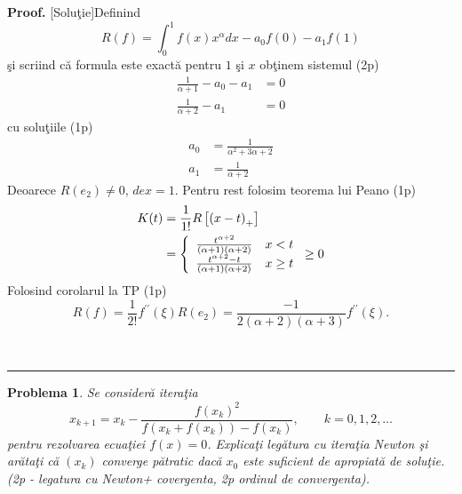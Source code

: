 \documentclass{article}%
\newtheorem{problem}[theorem]{Problema}
\newenvironment{proof}[1][Proof]{\noindent\textbf{#1.} }{\ \rule{0.5em}{0.5em}}
\begin{document}
\begin{proof}
[Solu\c{t}ie]Definind%
\[
R(f)=\int_{0}^{1}f(x)x^{\alpha}dx-a_{0}f(0)-a_{1}f(1)
\]
\c{s}i scriind c\u{a} formula este exact\u{a} pentru $1$ \c{s}i $x$
ob\c{t}inem sistemul (2p)%
\begin{align*}
\frac{1}{\alpha+1}-a_{0}-a_{1} &  =0\\
\frac{1}{\alpha+2}-a_{1} &  =0
\end{align*}
cu solu\c{t}iile (1p)%
\begin{align*}
a_{0} &  =\frac{1}{\alpha^{2}+3\alpha+2}\\
a_{1} &  =\frac{1}{\alpha+2}%
\end{align*}
Deoarece $R(e_{2})\neq0$, $dex=1$. Pentru rest folosim teorema lui Peano (1p)%
\begin{align*}
K(t) &  =\frac{1}{1!}R\left[  \left(  x-t\right)  _{+}\right]  \\
&  =\left\{
\begin{array}
[c]{cc}%
\frac{t^{\alpha+2}}{\left(  \alpha+1\right)  \left(  \alpha+2\right)  } &
x<t\\
\frac{t^{\alpha+2}-t}{\left(  \alpha+1\right)  \left(  \alpha+2\right)  } &
x\geq t
\end{array}
\right.  \geq0
\end{align*}
Folosind corolarul la TP (1p)%
\[
R(f)=\frac{1}{2!}f^{\prime\prime}(\xi)R(e_{2})=\frac{-1}{2\left(
\alpha+2\right)  (\alpha+3)}f^{\prime\prime}(\xi).
\]

\end{proof}

\begin{problem}
\label{p5.70} Se consider\u{a} itera\c{t}ia%
\[
x_{k+1}=x_{k}-\frac{f(x_{k})^{2}}{f\left(  x_{k}+f(x_{k})\right)  -f(x_{k}%
)},\qquad k=0,1,2,\dots
\]
pentru rezolvarea ecua\c{t}iei $f(x)=0$. Explica\c{t}i leg\u{a}tura cu
itera\c{t}ia Newton \c{s}i ar\u{a}ta\c{t}i c\u{a} $(x_{k})$ converge
p\u{a}tratic dac\u{a} $x_{0}$ este suficient de apropiat\u{a} de solu\c{t}ie.
(2p - legatura cu Newton+ covergenta, 2p ordinul de convergenta).
\end{problem}
\end{document}
